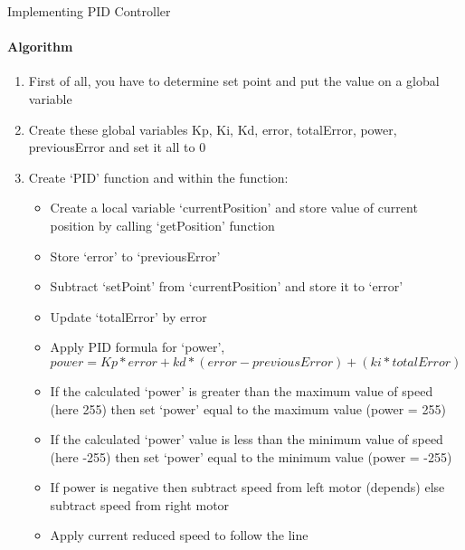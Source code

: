 \documentclass{beamer}
\begin{document}
  
  \begin{frame}[allowframebreaks]{Implementing PID Controller}
  \framesubtitle{Algorithm}
  
  \begin{enumerate}
		
		\item{First of all, you have to determine set point and put the value on a global variable}
		
		\item{Create these \alert{global} variables Kp, Ki, Kd, error, totalError, power, previousError and set it all to 0} 
		
		\item{Create `PID' function and within the function:
		
			\begin{itemize}
					
				\item{Create a local variable `currentPosition' and store value of current position by calling `getPosition' function}
				
				\item{Store `error' to `previousError'}
				
				\item{Subtract `setPoint' from `currentPosition' and store it to `error'}
				
				\item{Update `totalError' by error}
				
				\item{Apply PID formula for `power', $power = Kp * error + {kd * (error - previousError)} + (ki * totalError)$}
				
				\item{If the calculated `power' is greater than the maximum value of speed (here 255) then set `power' equal to the maximum value (power = 255)}
				
				\item{If the calculated `power' value is less than the minimum value of speed (here -255) then set `power' equal to the minimum value (power = -255)} 	
				
				\item{If power is negative then subtract speed from left motor (depends) else subtract speed from right motor}
				
				\item{Apply current reduced speed to follow the line}		
			
			\end{itemize}
			
			}
  
  \end{enumerate}
  
  \end{frame}
  
\end{document}
